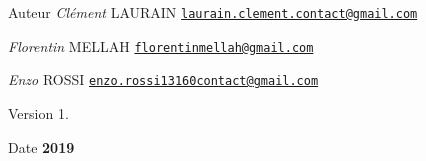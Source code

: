 \begin{DoxyAuthor}{Auteur}
{\itshape Clément} L\+A\+U\+R\+A\+IN \href{mailto:laurain.clement.contact@gmail.com}{\tt laurain.\+clement.\+contact@gmail.\+com} 

{\itshape Florentin} M\+E\+L\+L\+AH \href{mailto:florentinmellah@gmail.com}{\tt florentinmellah@gmail.\+com} 

{\itshape Enzo} R\+O\+S\+SI \href{mailto:enzo.rossi13160contact@gmail.com}{\tt enzo.\+rossi13160contact@gmail.\+com} 
\end{DoxyAuthor}
\begin{DoxyVersion}{Version}
1. 
\end{DoxyVersion}
\begin{DoxyDate}{Date}
{\bfseries 2019} 
\end{DoxyDate}
